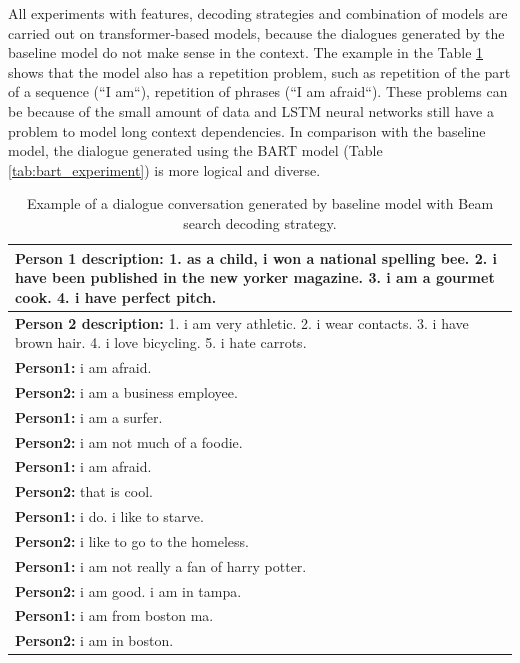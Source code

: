 All experiments with features, decoding strategies and combination of models are carried out on transformer-based models, because the dialogues generated by the baseline model do not make sense in the context. The example in the Table \ref{tab:baseline_experiment} shows that the model also has a repetition problem, such as repetition of the part of a sequence (``I am``), repetition of phrases (``I am afraid``). These problems can be because of the small amount of data and LSTM neural networks still have a problem to model long context dependencies. In comparison with the baseline model, the dialogue generated using the BART model (Table \ref{tab:bart_experiment}) is more logical and diverse.

\begin{table}[H]
\centering
 \begin{tabular}{|p{14cm}|}
 \hline
 \textbf{Person 1 description:} 1. as a child, i won a national spelling bee. 2. i have been published in the new yorker magazine. 3. i am a gourmet cook. 4. i have perfect pitch. \\
 \hline
 \textbf{Person 2 description:} 1. i am very athletic. 2. i wear contacts. 3. i have brown hair. 4. i love bicycling. 5. i hate carrots. \\
 \hline
 \textbf{Person1:} i am afraid. \\
 \textbf{Person2:} i am a business employee.  \\ 
 \textbf{Person1:} i am a surfer. \\
 \textbf{Person2:} i am not much of a foodie. \\
 \textbf{Person1:} i am afraid. \\
 \textbf{Person2:} that is cool. \\
 \textbf{Person1:} i do. i like to starve. \\
 \textbf{Person2:} i like to go to the homeless. \\
 \textbf{Person1:} i am not really a fan of harry potter. \\
 \textbf{Person2:} i am good. i am in tampa. \\
 \textbf{Person1:} i am from boston ma. \\
 \textbf{Person2:} i am in boston. \\
 \hline
 \end{tabular}
 \caption{Example of a dialogue conversation generated by baseline model with Beam search decoding strategy.}
\label{tab:baseline_experiment}
\end{table}

